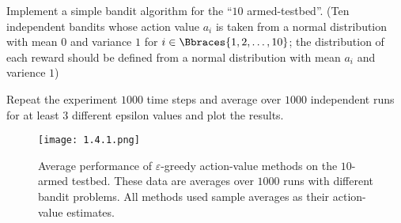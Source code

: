 
\begin{exercise}

Implement a simple bandit algorithm for the \enquote{$10$ armed-testbed}.
(Ten independent bandits whose action value $a_i$ is taken from a normal distribution with mean $0$ and variance $1$ for $i \in \Bbraces{1, 2, \dots, 10}$; the distribution of each reward should be defined from a normal distribution with mean $a_i$ and varience $1$)

Repeat the experiment $1000$ time steps and average over $1000$ independent runs for at least $3$ different epsilon values and plot the results.

\end{exercise}


\begin{solution}

\phantom{}

\begin{figure}[H]
    \centering
    \texttt{[image: 1.4.1.png]}
    \caption
    {
        Average performance of $\varepsilon$-greedy action-value methods on the $10$-armed testbed.
        These data are averages over $1000$ runs with different bandit problems.
        All methods used sample averages as their action-value estimates.
    }
    \label{fig:1.4}
\end{figure}

\end{solution}

